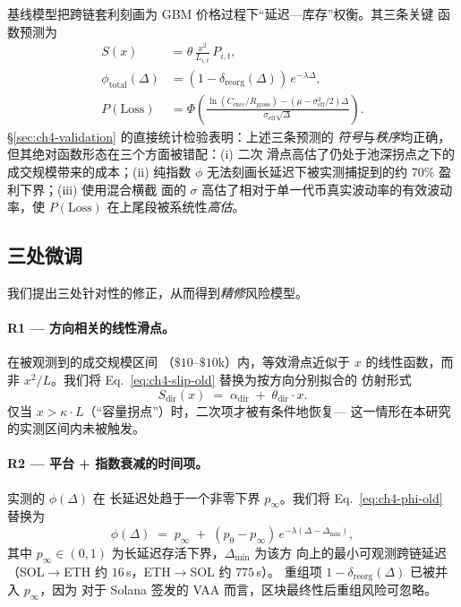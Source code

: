 \documentclass[11pt,a4paper]{ctexart}
\newcommand{\SolEth}{SOL$\to$ETH}
\newcommand{\EthSol}{ETH$\to$SOL}
\newcommand{\Cexec}{C_{\text{exec}}}
\newcommand{\Rgross}{R_{\text{gross}}}
\begin{document}
基线模型把跨链套利刻画为 GBM 价格过程下“延迟---库存”权衡。其三条关键
函数预测为
\begin{align}
    \label{eq:ch4-slip-old}
    S(x) &= \theta\,\frac{x^{2}}{L_{i,t}}\,P_{i,t}, \\
    \label{eq:ch4-phi-old}
    \phi_{\text{total}}(\Delta) &= (1-\delta_{\text{reorg}}(\Delta))\,
        e^{-\lambda\Delta}, \\
    \label{eq:ch4-ploss-old}
    P(\text{Loss}) &= \Phi\!\left(\frac{\ln(\Cexec/\Rgross) -
        (\mu - \sigma_{\text{eff}}^{2}/2)\Delta}
        {\sigma_{\text{eff}}\sqrt{\Delta}}\right).
\end{align}
\S\ref{sec:ch4-validation} 的直接统计检验表明：上述三条预测的\emph{
符号}与\emph{秩序}均正确，但其绝对函数形态在三个方面被错配：(i) 二次
滑点高估了仍处于池深拐点之下的成交规模带来的成本；(ii) 纯指数 $\phi$
无法刻画长延迟下被实测捕捉到的约 $70\%$ 盈利下界；(iii) 使用混合横截
面的 $\sigma$ 高估了相对于单一代币真实波动率的有效波动率，使
$P(\text{Loss})$ 在上尾段被系统性\emph{高估}。

\subsection{三处微调}

我们提出三处针对性的修正，从而得到\textit{精修}风险模型。

\paragraph{R1 --- 方向相关的线性滑点。} 在被观测到的成交规模区间
（$\$10$--$\$10$k）内，等效滑点近似于 $x$ 的线性函数，而非
$x^{2}/L$。我们将 Eq.~\eqref{eq:ch4-slip-old} 替换为按方向分别拟合的
仿射形式
\begin{equation}
\label{eq:ch4-slip-new}
    S_{\text{dir}}(x) \;=\; \alpha_{\text{dir}} \;+\; \theta_{\text{dir}}\cdot x.
\end{equation}
仅当 $x > \kappa\cdot L$（“容量拐点”）时，二次项才被有条件地恢复---
这一情形在本研究的实测区间内未被触发。

\paragraph{R2 --- 平台 + 指数衰减的时间项。} 实测的 $\phi(\Delta)$ 在
长延迟处趋于一个非零下界 $p_{\infty}$。我们将 Eq.~\eqref{eq:ch4-phi-old}
替换为
\begin{equation}
\label{eq:ch4-phi-new}
    \phi(\Delta) \;=\; p_{\infty} \;+\;
        (p_{0} - p_{\infty})\,e^{-\lambda(\Delta-\Delta_{\min})},
\end{equation}
其中 $p_{\infty} \in (0,1)$ 为长延迟存活下界，$\Delta_{\min}$ 为该方
向上的最小可观测跨链延迟（\SolEth{} 约 $16$\,s，\EthSol{} 约 $775$\,s）。
重组项 $1-\delta_{\text{reorg}}(\Delta)$ 已被并入 $p_{\infty}$，因为
对于 Solana 签发的 VAA 而言，区块最终性后重组风险可忽略。
\end{document}
